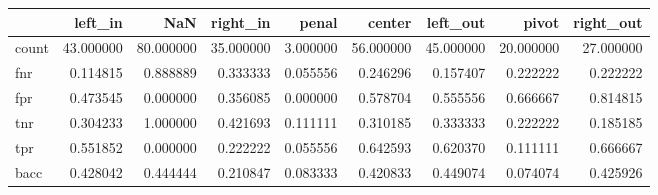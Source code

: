 \begin{tabular}{lrrrrrrrr}
\toprule
{} &    left\_in &        NaN &   right\_in &     penal &     center &   left\_out &      pivot &  right\_out \\
\midrule
count &  43.000000 &  80.000000 &  35.000000 &  3.000000 &  56.000000 &  45.000000 &  20.000000 &  27.000000 \\
fnr   &   0.114815 &   0.888889 &   0.333333 &  0.055556 &   0.246296 &   0.157407 &   0.222222 &   0.222222 \\
fpr   &   0.473545 &   0.000000 &   0.356085 &  0.000000 &   0.578704 &   0.555556 &   0.666667 &   0.814815 \\
tnr   &   0.304233 &   1.000000 &   0.421693 &  0.111111 &   0.310185 &   0.333333 &   0.222222 &   0.185185 \\
tpr   &   0.551852 &   0.000000 &   0.222222 &  0.055556 &   0.642593 &   0.620370 &   0.111111 &   0.666667 \\
bacc  &   0.428042 &   0.444444 &   0.210847 &  0.083333 &   0.420833 &   0.449074 &   0.074074 &   0.425926 \\
\bottomrule
\end{tabular}
